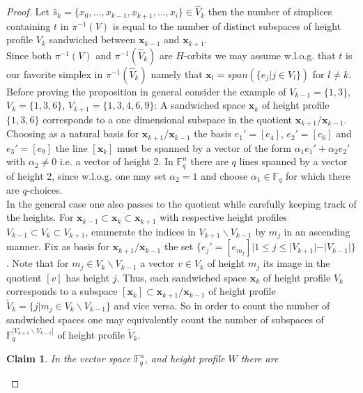 \documentclass[11pt]{amsart}
\newtheorem{claim}{Claim}
\begin{document}
    \begin{proof}
        Let $\hat{s}_k=\{x_0,\dots, x_{k-1},x_{k+1}, \dots, x_i\}\in \hat{V}_k$ then the number of simplices containing $t$ in $\pi^{-1}(V)$ is equal to the number of distinct subspaces of height profile $V_k$ sandwiched between $\mathbf{x}_{k-1}$ and $\mathbf{x}_{k+1}$.\\
        Since both $\pi^{-1}(V)$ and $\pi^{-1}(\hat{V}_k)$ are $H$-orbits we may assume w.l.o.g. that $t$ is our favorite simplex in $\pi^{-1}(\hat{V}_k)$ namely that $\mathbf{x}_l=span(\{e_j|j\in V_l\})$ for $l\neq k$.\\
        Before proving the proposition in general consider the example of $V_{k-1}=\{1,3\}$,$V_k=\{1,3,6\}$, $V_{k+1}=\{1,3,4,6,9\}$: A sandwiched space $\mathbf{x}_k$ of height profile $\{1,3,6\}$ corresponds to a one dimensional subspace in the quotient $\mathbf{x}_{k+1}/\mathbf{x}_{k-1}$. Choosing as a natural basis for $\mathbf{x}_{k+1}/\mathbf{x}_{k-1}$ the basis $e_1'=[e_4]$, $e_2'=[e_6]$ and $e_3'=[e_9]$ the line $[\mathbf{x}_k]$ must be spanned by a vector of the form $\alpha_1 e_1'+\alpha_2 e_2'$ with $\alpha_2\neq 0$ i.e. a vector of height 2.  In $\mathbb{F}_q^n$ there are $q$ lines spanned by a vector of height 2, since w.l.o.g. one may set $\alpha_2=1$ and choose $\alpha_1\in \mathbb{F}_q$ for which there are $q$-choices.\\
        In the general case one also passes to the quotient while carefully keeping track of the heights.  For $\mathbf{x}_{k-1}\subset \mathbf{x}_k\subset \mathbf{x}_{k+1}$ with respective height profiles $V_{k-1}\subset V_k\subset V_{k+1}$, enumerate the indices in $V_{k+1}\backslash V_{k-1}$ by $m_j$ in an ascending manner. Fix as basis for $\mathbf{x}_{k+1}/\mathbf{x}_{k-1}$ the set $\{e_j'=[e_{m_j}]|1\leq j\leq |V_{k+1}|-|V_{k-1}|\} $. Note that for $m_j\in V_k\backslash V_{k-1}$ a vector $v\in V_k$ of height $m_j$ its image in the quotient $[v]$ has height $j$. Thus, each sandwiched space $\mathbf{x}_k$ of height profile $V_k$  corresponds to a subspace $[\mathbf{x}_k]\subset \mathbf{x}_{k+1}/\mathbf{x}_{k-1}$ of height profile $\tilde{V}_k=\{j|m_j\in V_k\backslash V_{k-1}\}$ and vice versa. So in order to count the number of sandwiched spaces one may equivalently count the number of subspaces of $\mathbb{F}_q^{|V_{k+1}\backslash V_{k-1}|}$ of height profile $\tilde{V}_k$. 
        \begin{claim}
            In the vector space $\mathbb{F}_q^n$, and height profile $W$ there are
            \begin{equation}

\end{equation}
\end{claim}
\end{proof}
\end{document}
